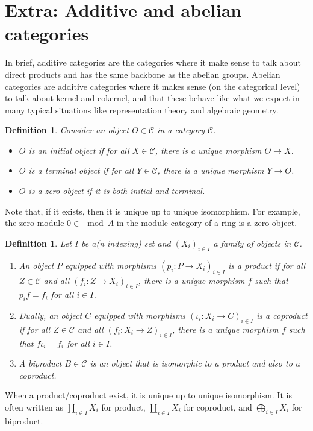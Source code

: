 \documentclass[11pt,a4paper]{article}
\numberwithin{equation}{section}
\theoremstyle{all}
\newtheorem{definition}[theorem]{Definition}
\theoremstyle{remark}
\newcommand{\CC}{\mathcal{C}}
\newcommand{\defn}[1]{\textsl{\color{darkblue} #1}}
\begin{document}
\pagebreak
\section{Extra: Additive and abelian categories}

In brief, additive categories are the categories where it make sense to talk about direct products and has the same backbone as the abelian groups.
Abelian categories are additive categories where it makes sense (on the categorical level) to talk about kernel and cokernel, and that these behave like what we expect in many typical situations like representation theory and algebraic geometry.

\begin{definition}
Consider an object $O\in \CC$ in a category $\CC$.
\begin{itemize}
\item $O$ is an \defn{initial object} if for all $X\in \CC$, there is a \emph{unique} morphism $O \to X$. 

\item $O$ is a \defn{terminal object} if for all $Y\in \CC$, there is a \emph{unique} morphism $Y\to O$.

\item $O$ is a \defn{zero object} if it is both initial and terminal.
\end{itemize}
\end{definition}
Note that, if it exists, then it is unique up to unique isomorphism.  For example, the zero module $0\in \mod A$ in the module category of a ring is a zero object.


\begin{definition}
Let $I$ be a(n indexing) set and $(X_i)_{i\in I}$ a family of objects in $\CC$.  
\begin{enumerate}
\item An object $P$ equipped with morphisms $(p_i:P\to X_i)_{i\in I}$ is a \defn{product} if for all $Z\in \CC$ and all $(f_i:Z\to X_i)_{i\in I}$, there is a unique morphism $f$ such that $p_if = f_i$ for all $i\in I$.

\item Dually, an object $C$ equipped with morphisms $(\iota_i:X_i\to C)_{i\in I}$ is a \defn{coproduct} if for all $Z\in \CC$ and all $(f_i:X_i\to Z)_{i\in I}$, there is a unique morphism $f$ such that $f\iota_i = f_i$ for all $i\in I$.

\item A \defn{biproduct} $B\in \CC$ is an object that is isomorphic to a product and also to a coproduct.
\end{enumerate}
\end{definition}
When a product/coproduct exist, it is unique up to unique isomorphism.  It is often written as $\prod_{i\in I} X_i$ for product, $\coprod_{i\in I} X_i$ for coproduct, and $\bigoplus_{i\in I} X_i$ for biproduct.
\end{document}
